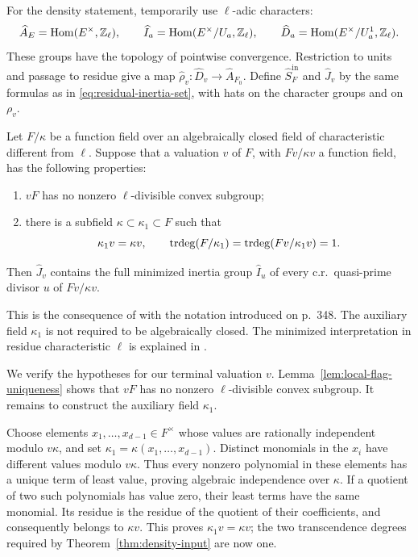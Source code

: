 For the density statement, temporarily use \(\ell\)-adic characters:
\[
 \widehat A_E=\operatorname{Hom}(E^\times,\mathbb Z_\ell),\qquad
 \widehat I_a=\operatorname{Hom}(E^\times/U_a,\mathbb Z_\ell),\qquad
 \widehat D_a=\operatorname{Hom}(E^\times/U_a^1,\mathbb Z_\ell).
\]
These groups have the topology of pointwise convergence. Restriction to
units and passage to residue give a map
\(\widehat\rho_v:\widehat D_v\to\widehat A_{F_0}\).
Define \(\widehat S_F^{\mathrm{in}}\) and \(\widehat J_v\) by the same
formulas as in \eqref{eq:residual-inertia-set}, with hats on the character
groups and on \(\rho_v\).

\begin{theorem}\label{thm:density-input}
Let \(F/\kappa\) be a function field over an algebraically closed field
of characteristic different from \(\ell\). Suppose that a valuation
\(v\) of \(F\), with \(Fv/\kappa v\) a function field, has the following
properties:
\begin{enumerate}
 \item \(vF\) has no nonzero \(\ell\)-divisible convex subgroup;
 \item there is a subfield \(\kappa\subset\kappa_1\subset F\) such that
 \[
   \kappa_1v=\kappa v,\qquad
   \operatorname{trdeg}(F/\kappa_1)=\operatorname{trdeg}(Fv/\kappa_1v)=1.
 \]
\end{enumerate}
Then \(\widehat J_v\) contains the full minimized inertia group
\(\widehat I_u\) of every c.r.\ quasi-prime divisor \(u\) of
\(Fv/\kappa v\).
\end{theorem}

This is the consequence of \cite[Theorem~1.2 and the proof of
Theorem~4.2, p.~351, item~2]{Pop2015} with the notation introduced on
p.~348. The auxiliary field \(\kappa_1\) is not required to be
algebraically closed. The minimized interpretation in residue
characteristic \(\ell\) is explained in
\cite[Remark~4.1 and the appendix, Section~A]{Pop2015}.

We verify the hypotheses for our terminal valuation \(v\).
Lemma~\ref{lem:local-flag-uniqueness} shows that \(vF\) has no nonzero
\(\ell\)-divisible convex subgroup. It remains to construct the
auxiliary field \(\kappa_1\).

Choose elements \(x_1,\ldots,x_{d-1}\in F^\times\) whose values are
rationally independent modulo \(v\kappa\), and set
\(\kappa_1=\kappa(x_1,\ldots,x_{d-1})\).
Distinct monomials in the \(x_i\) have different values modulo
\(v\kappa\). Thus every nonzero polynomial in these elements has a unique
term of least value, proving algebraic independence over \(\kappa\).
If a quotient of two such polynomials has value zero, their least terms
have the same monomial. Its residue is the residue of the quotient of
their coefficients, and consequently belongs to \(\kappa v\).
This proves \(\kappa_1v=\kappa v\); the two transcendence degrees required
by Theorem~\ref{thm:density-input} are now one.

